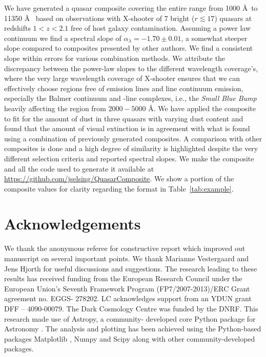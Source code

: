 \documentclass{aa}    %
\newcommand{\Tab}[1]{Table~\ref{tab:#1}}
\newcommand{\tab}[1]{\Tab{#1}}
\newcommand{\sectlabel}[1]{\label{sect:#1}}
\newcommand{\feii}{\ion{Fe}{ii}}
\begin{document}
We have generated a quasar composite covering the entire range from 1000 \AA~to
11350 \AA~ based on observations with X-shooter of 7 bright ($r \lesssim 17$)
quasars at redshifts $1 < z < 2.1$ free of host galaxy contamination. Assuming a
power law continuum we find a spectral slope of $\alpha_\lambda = -1.70 \pm 0.01$, a
somewhat steeper slope compared to composites presented by other authors. We
find a consistent slope within errors for various combination methods. We
attribute the discrepancy between the power-law slopes to the different wavelength
coverage's, where the very large wavelength coverage of X-shooter ensures that we
can effectively choose regions free of emission lines and line continuum
emission, especially the Balmer continuum and \feii-line complexes, i.e., the
\textit{Small Blue Bump} heavily affecting the region from $2000 - 5000$ \AA. We
have applied the composite to fit for the amount of dust in three quasars with
varying dust content and found that the amount of visual extinction is in
agreement with what is found using a combination of previously generated
composites. A comparison with other composites is done and a high degree of similarity is highlighted despite the very different selection criteria and
reported spectral slopes.
We make the composite and all the code used to generate it available at
\url{https://github.com/jselsing/QuasarComposite}. We show a portion of the
composite values for clarity regarding the format in \tab{example}.

 


\section{Acknowledgements}  \sectlabel{Acknowledgements}

We thank the anonymous referee for constructive report which improved out
manuscript on several important points. We thank Marianne Vestergaard and Jens
Hjorth for useful discussions and suggestions. The research leading to these
results has received funding from the European Research Council under the
European Union’s Seventh Framework Program (FP7/2007-2013)/ERC Grant agreement
no. EGGS- 278202. LC acknowledges support from an YDUN grant DFF – 4090-00079.
The Dark Cosmology Centre was funded by the DNRF. This research made use of
Astropy, a community- developed core Python package for Astronomy
\citep{TheAstropyCollaboration2013}. The analysis and plotting has been achieved
using the Python-based packages Matplotlib \citep{Hunter2007}, Numpy and Scipy
\citep{VanderWalt2011} along with other community-developed packages.
\end{document}
